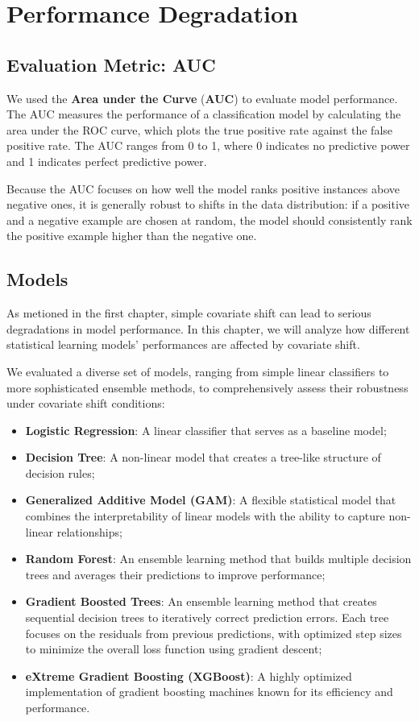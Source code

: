 \chapter{Performance Degradation}

\section{Evaluation Metric: AUC}

We used the \textbf{Area under the Curve} (\textbf{AUC}) to evaluate model performance. The AUC measures the performance of a classification model by calculating the area under the ROC curve, which plots the true positive rate against the false positive rate. The AUC ranges from 0 to 1, where 0 indicates no predictive power and 1 indicates perfect predictive power.

Because the AUC focuses on how well the model ranks positive instances above negative ones, it is generally robust to shifts in the data distribution: if a positive and a negative example are chosen at random, the model should consistently rank the positive example higher than the negative one. 

\section{Models}

As metioned in the first chapter, simple covariate shift can lead to serious degradations in model performance. In this chapter, we will analyze how different statistical learning models' performances are affected by covariate shift. 

We evaluated a diverse set of models, ranging from simple linear classifiers to more sophisticated ensemble methods, to comprehensively assess their robustness under covariate shift conditions:

\begin{itemize}
    \item \textbf{Logistic Regression}: A linear classifier that serves as a baseline model;
    \item \textbf{Decision Tree}: A non-linear model that creates a tree-like structure of decision rules;
    \item \textbf{Generalized Additive Model (GAM)}: A flexible statistical model that combines the interpretability of linear models with the ability to capture non-linear relationships;
    \item \textbf{Random Forest}: An ensemble learning method that builds multiple decision trees and averages their predictions to improve performance;
    \item \textbf{Gradient Boosted Trees}: An ensemble learning method that creates sequential decision trees to iteratively correct prediction errors. Each tree focuses on the residuals from previous predictions, with optimized step sizes to minimize the overall loss function using gradient descent;
    \item \textbf{eXtreme Gradient Boosting (XGBoost)}: A highly optimized implementation of gradient boosting machines known for its efficiency and performance.
\end{itemize}

